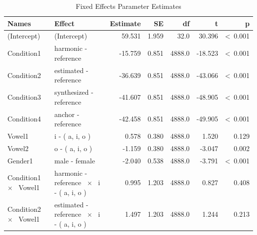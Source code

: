 \documentclass[a4paper,man,hidelinks,floatsintext]{apa7}
\begin{document}
    
\begin{table}[!htbp]
\caption{Fixed Effects Parameter Estimates}
\label{tab:Table_3}
\begin{adjustbox}{max size={\columnwidth}{\textheight}}
\centering
\begin{tabular}{llrrrrr}
\hline
Names                                           & Effect                                                                      & Estimate &    SE &     df &       t &               p \\
\hline
(Intercept)                                     & (Intercept)                                                                 &   59.531 & 1.959 &   32.0 &  30.396 & \textless~0.001 \\
Condition1                                      & harmonic - reference                                                        &  -15.759 & 0.851 & 4888.0 & -18.523 & \textless~0.001 \\
Condition2                                      & estimated - reference                                                       &  -36.639 & 0.851 & 4888.0 & -43.066 & \textless~0.001 \\
Condition3                                      & synthesized - reference                                                     &  -41.607 & 0.851 & 4888.0 & -48.905 & \textless~0.001 \\
Condition4                                      & anchor - reference                                                          &  -42.458 & 0.851 & 4888.0 & -49.905 & \textless~0.001 \\
Vowel1                                          & i - ( a, i, o )                                                             &    0.578 & 0.380 & 4888.0 &   1.520 &           0.129 \\
Vowel2                                          & o - ( a, i, o )                                                             &   -1.159 & 0.380 & 4888.0 &  -3.047 &           0.002 \\
Gender1                                         & male - female                                                               &   -2.040 & 0.538 & 4888.0 &  -3.791 & \textless~0.001 \\
Condition1 ~$\times$~ Vowel1                    & harmonic - reference ~$\times$~ i - ( a, i, o )                             &    0.995 & 1.203 & 4888.0 &   0.827 &           0.408 \\
Condition2 ~$\times$~ Vowel1                    & estimated - reference ~$\times$~ i - ( a, i, o )                            &    1.497 & 1.203 & 4888.0 &   1.244 &           0.213 \\

\end{tabular}
\end{adjustbox}
\end{table}
\end{document}

